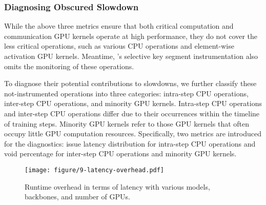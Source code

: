 

\subsubsection{Diagnosing Obscured Slowdown}
While the above three metrics ensure that both critical computation and communication GPU kernels operate at high performance, they do not cover the less critical operations, such as various CPU operations and element-wise activation GPU kernels. Meantime, \sysname{}’s selective key segment instrumentation also omits the monitoring of these operations. 

To diagnose their potential contributions to slowdowns, we further classify these not-instrumented operations into three categories: intra-step CPU operations, inter-step CPU operations, and minority GPU kernels.
Intra-step CPU operations and inter-step CPU operations differ due to their occurrences within the timeline of training steps.
Minority GPU kernels refer to those GPU kernels that often occupy little GPU computation resources. 
Specifically, two metrics are introduced for the diagnostics: issue latency distribution for intra-step CPU operations and void percentage for inter-step CPU operations and minority GPU kernels.

\begin{figure*}
    \centering
    \texttt{[image: figure/9-latency-overhead.pdf]}
    \vspace{-2mm}
    \caption{Runtime overhead in terms of latency with various models, backbones, and number of GPUs.}
    \label{fig:eval:latency-overhead}
    \vspace{-4mm}
\end{figure*}

